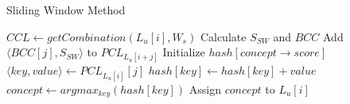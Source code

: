 \begin{algorithm}[th]
\caption{Sliding Window Method}
\label{slide}
\begin{algorithmic}[1]
\State $CCL \leftarrow getCombination\left(L_u[i],W_s\right)$
\State Calculate $S_{SW}$ and $BCC$
\State Add $\langle BCC[j],S_{SW}\rangle$ to $PCL_{L_u[i+j]}$
\EndFor
\EndFor
{}
\State Initialize $hash[concept \rightarrow score]$
\State $\langle key,value\rangle \leftarrow PCL_{L_u[i]}[j]$
\State $hash[key] \leftarrow hash[key]+value$
\EndFor
\State $concept \leftarrow argmax_{key}\left(hash[key]\right)$
\State Assign $concept$ to $L_u[i]$
\EndIf
\EndFor
\EndProcedure
\end{algorithmic}
\end{algorithm}

%
%
%
